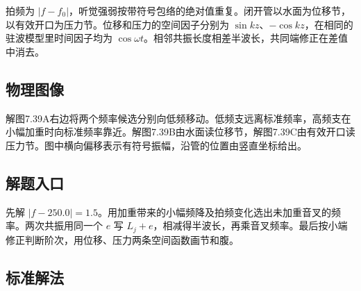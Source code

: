 \documentclass[UTF8,fontset=fandol,a4paper,11pt]{ctexart}
\begin{document}
拍频为 $|f-f_0|$，听觉强弱按带符号包络的绝对值重复。闭开管以水面为位移节，以有效开口为压力节。位移和压力的空间因子分别为 $\sin kz$、$-\cos kz$，在相同的驻波模型里时间因子均为 $\cos\omega t$。相邻共振长度相差半波长，共同端修正在差值中消去。




\subsection*{物理图像}

解图7.39A右边将两个频率候选分别向低频移动。低频支远离标准频率，高频支在小幅加重时向标准频率靠近。解图7.39B由水面读位移节，解图7.39C由有效开口读压力节。图中横向偏移表示有符号振幅，沿管的位置由竖直坐标给出。




\subsection*{解题入口}

先解 $|f-250.0|=1.5$。用加重带来的小幅频降及拍频变化选出未加重音叉的频率。两次共振用同一个 $e$ 写 $L_j+e$，相减得半波长，再乘音叉频率。最后按小端修正判断阶次，用位移、压力两条空间函数画节和腹。



\subsection*{标准解法}
\end{document}
